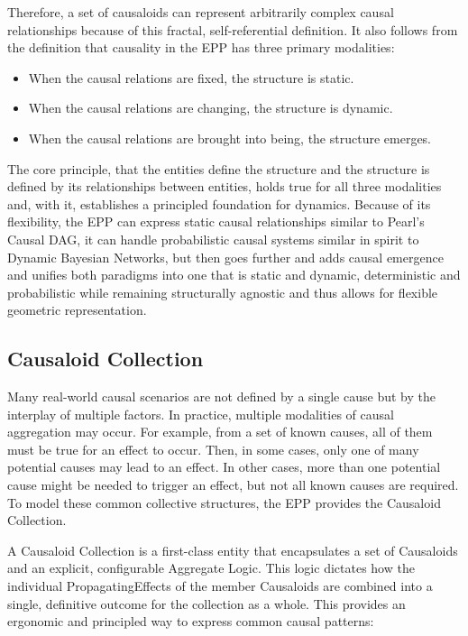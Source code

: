 Therefore, a set of causaloids can represent arbitrarily complex causal relationships because of this fractal, self-referential definition. It also follows from the definition that causality in the EPP has three primary modalities:
\begin{itemize}
	\item When the causal relations are fixed, the structure is static.
 	\item When the causal relations are changing, the structure is dynamic. 
 	\item When the causal relations are brought into being, the structure emerges. 
\end{itemize}

The core principle, that the entities define the structure and the structure is defined by its relationships between entities, holds true for all three modalities and, with it, establishes a principled foundation for dynamics. Because of its flexibility, the EPP can express static causal relationships similar to Pearl’s Causal DAG, it can handle probabilistic causal systems similar in spirit to Dynamic Bayesian Networks, but then goes further and  adds causal emergence and unifies both paradigms into one that is static and dynamic, deterministic and probabilistic while remaining structurally agnostic and thus allows for flexible geometric representation.

%
%
\subsection{Causaloid Collection}
\label{sec:epp_causaloid_collection}


Many real-world causal scenarios are not defined by a single cause but by the interplay of multiple factors. In practice, multiple modalities of causal aggregation may occur. For example, from a set of known causes, all of them must be true for an effect to occur. Then, in some cases, only one of many potential causes may lead to an effect. In other cases, more than one potential cause might be needed to trigger an effect, but not all known causes are required. To model these common collective structures, the EPP provides the Causaloid Collection.

A Causaloid Collection is a first-class entity that encapsulates a set of Causaloids and an explicit, configurable Aggregate Logic. This logic dictates how the individual PropagatingEffects of the member Causaloids are combined into a single, definitive outcome for the collection as a whole. This provides an ergonomic and principled way to express common causal patterns:


